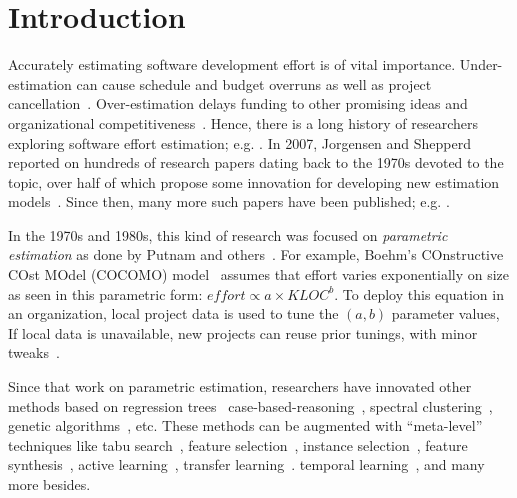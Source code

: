 \documentclass{sig-alternate}
\begin{document}
\section{Introduction}
Accurately estimating software development
effort  is of vital
importance. 
Under-estimation can cause schedule and budget
overruns as well as project
cancellation~\cite{CLCS03}.  Over-estimation delays
funding to other promising ideas and
organizational competitiveness~\cite{koc11a}.
Hence, there is a long history
of researchers exploring software effort estimation; e.g. \cite{wol74,frei79,putnam76,black77,herd77,watson77,jensen83,park88,boehm81,Walkerden1999,shepperd97,jorgensen05,me06d,burgess01}.
In 2007, Jorgensen and Shepperd
reported on hundreds of research papers dating back to the 1970s devoted to
the topic, over half of which propose some innovation
for developing new estimation
models~\cite{jorgensen05}. Since then,
many more such papers have been published;
e.g. \cite{lokan06,cora10,minku14,Li2007,Li2009a,keung2008a,keung2008b,keung2008c,koc11b,me12a,me13a,kocaguneli2014transfer}.


In the 1970s and 1980s, this kind of research was focused on
{\em parametric estimation} as done 
by Putnam and
others~\cite{wol74,frei79,black77,herd77,watson77,boehm81}. For example, Boehm's
COnstructive COst MOdel (COCOMO)
model~\cite{boehm81} 
 assumes  that effort varies exponentially on size as seen in this parametric form:
$\mathit{effort} \propto \mathit{a \times KLOC}^b$. To deploy this equation in an organization,
local project data is used to tune the  $(a,b)$ parameter values, If local
data is unavailable, new projects can reuse prior tunings,  with  minor
tweaks~\cite{me04h}. 

 

  


Since that work on parametric estimation, researchers
have innovated other methods based on
regression
trees~\cite{shepperd97}
case-based-reasoning~\cite{shepperd97}, spectral
clustering~\cite{me12d}, genetic
algorithms~\cite{cordero97,burgess01}, etc.  These methods
can be augmented with  ``meta-level'' techniques like tabu search~\cite{cora10}, feature selection~\cite{chen05}, instance selection~\cite{koc11b},
feature synthesis~\cite{me12a}, active learning~\cite{me13a}, transfer learning~\cite{kocaguneli2014transfer}.
temporal learning~\cite{lokan09,minku14}, and many more besides.
\end{document}
